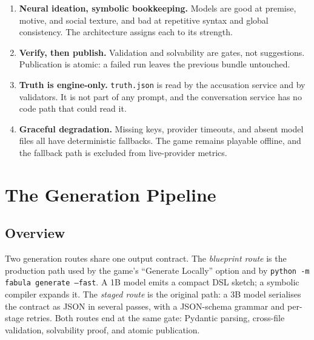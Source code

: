 ﻿\documentclass[11pt,a4paper]{report}
\begin{document}
\begin{enumerate}
  \item \textbf{Neural ideation, symbolic bookkeeping.} Models are good at premise, motive, and social texture, and bad at repetitive syntax and global consistency. The architecture assigns each to its strength.
  \item \textbf{Verify, then publish.} Validation and solvability are gates, not suggestions. Publication is atomic: a failed run leaves the previous bundle untouched.
  \item \textbf{Truth is engine-only.} \texttt{truth.json} is read by the accusation service and by validators. It is not part of any prompt, and the conversation service has no code path that could read it.
  \item \textbf{Graceful degradation.} Missing keys, provider timeouts, and absent model files all have deterministic fallbacks. The game remains playable offline, and the fallback path is excluded from live-provider metrics.
\end{enumerate}

\chapter{The Generation Pipeline}
\label{ch:generation}

\section{Overview}
Two generation routes share one output contract. The \emph{blueprint route} is the production path used by the game's ``Generate Locally'' option and by \texttt{python -m fabula generate --fast}. A 1B model emits a compact DSL sketch; a symbolic compiler expands it. The \emph{staged route} is the original path: a 3B model serialises the contract as JSON in several passes, with a JSON-schema grammar and per-stage retries. Both routes end at the same gate: Pydantic parsing, cross-file validation, solvability proof, and atomic publication.
\end{document}

